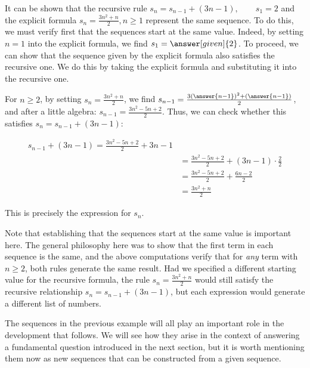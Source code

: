 \documentclass{ximera}
\begin{document}
\begin{remark}
It can be shown that the recursive rule $s_n = s_{n-1} + (3n-1), \qquad s_1 =2$ and the explicit formula $s_n = \frac{3n^2+n}{2}
, n \geq 1$ represent the same sequence.  To do this, we must verify first that the sequences start at the same value.  Indeed, by setting $n=1$ into the explicit formula, we find $s_1 = \answer[given]{2}$.  To proceed, we can show that the sequence given by the explicit formula also satisfies the recursive one.  We do this by taking the explicit formula and substituting it into the recursive one.  

For $n \geq 2$, by setting $s_n = \frac{3n^2+n}{2}$, we find $s_{n-1} = \frac{3(\answer{n-1})^2+(\answer{n-1})}{2}$, and after a little algebra: $s_{n-1} = \frac{3n^2-5n+2}{2}$.  Thus, we can check whether this satisfies $s_n = s_{n-1} + (3n-1)$:

\begin{align*}
 s_{n-1} + (3n-1) = \frac{3n^2-5n+2}{2} +3n-1 \\
 &=  \frac{3n^2-5n+2}{2} +(3n-1) \cdot \frac{2}{2} \\ 
 &= \frac{3n^2-5n+2}{2} + \frac{6n-2}{2} \\
 &= \frac{3n^2+n}{2} 
\end{align*}

This is precisely the expression for $s_n$.

Note that establishing that the sequences start at the same value is important here.  The general philosophy here was to show that the first term in each sequence is the same, and the above computations verify that for \emph{any} term with $n \geq 2$, both rules generate the same result.  Had we specified a different starting value for the recursive formula, the rule $s_n = \frac{3n^2+n}{2}$ would still satisfy the recursive relationship $s_n = s_{n-1} + (3n-1)$, but each expression would generate a different list of numbers.

\end{remark}

\begin{remark}
The sequences in the previous example will all play an important role in the development that follows.  We will see how they arise in the context of answering a fundamental question introduced in the next section, but it is worth mentioning them now as new sequences that can be constructed from a given sequence.
\end{remark}
\end{document}
